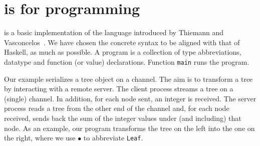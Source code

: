 \section{\freest{} is for programming}
\label{sec:programming}

\freest{} is a basic implementation of the language introduced by
Thiemann and Vasconcelos~\cite{DBLP:conf/icfp/ThiemannV16}.
%
We have chosen the concrete syntax to be aligned with that of Haskell,
as much as possible. A \freest{} program is a collection of type
abbreviations, datatype and function (or value) declarations. Function
\lstinline|main| runs the program.

Our example serializes a tree object on a channel. The aim is to
transform a tree by interacting with a remote server. The client
process streams a tree on a (single) channel. In addition, for each
node sent, an integer is received. The server process reads a tree
from the other end of the channel and, for each node received, sends
back the sum of the integer values under (and including) that
node.
%
\newcommand{\leaf}{$\bullet$}
%
As an example, our program transforms the tree on the left into the one
on the right, where we use \leaf{} to abbreviate \lstinline|Leaf|.

